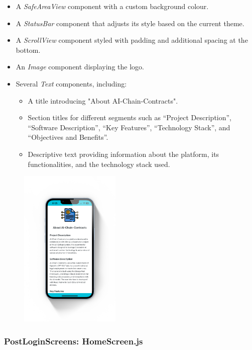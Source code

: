 \begin{itemize}
    \item A \textit{SafeAreaView} component with a custom background colour.
    \item A \textit{StatusBar} component that adjusts its style based on the current theme.
    \item A \textit{ScrollView} component styled with padding and additional spacing at the bottom.
    \item An \textit{Image} component displaying the logo.
    \item Several \textit{Text} components, including:
    \begin{itemize}
        \item A title introducing "About AI-Chain-Contracts".
        \item Section titles for different segments such as ``Project Description'', ``Software Description'', ``Key Features'', ``Technology Stack'', and ``Objectives and Benefits''.
        \item Descriptive text providing information about the platform, its functionalities, and the technology stack used.
    \end{itemize}
\end{itemize}

\begin{figure}[!ht]
    \centering
    \includegraphics[width=0.43\textwidth]{LATEX/Appendices/Images/Software/Frontend/about_us_screen.PNG}
    \label{fig:about us screen}
\end{figure}

\subsubsection{PostLoginScreens: HomeScreen.js}

